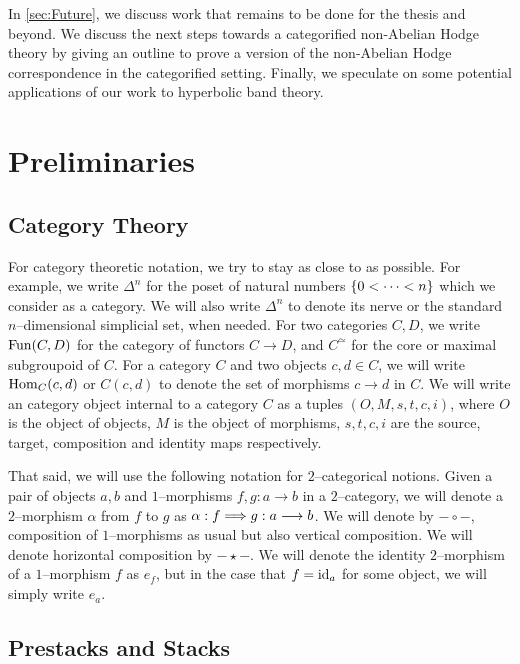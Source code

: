 \documentclass[11pt]{amsart}
\begin{document}
In \cref{sec:Future}, we discuss work that remains to be done for the thesis
and beyond. We discuss the next steps towards a categorified
non-Abelian Hodge theory by giving an outline to prove a version
of the non-Abelian Hodge correspondence in the categorified setting.
Finally, we speculate on some potential applications of our
work to hyperbolic band theory.


\section{Preliminaries}\label{sec:Prelim}

\subsection{Category Theory}

For category theoretic notation, we try to stay as close to \cite{HTT} as
possible. For example, we write $\Delta^n$ for the poset of natural numbers
$\set{0 < \dots < n}$ which we consider as a category. We will also write
$\Delta^n$ to denote its nerve or the standard $n$--dimensional
simplicial set, when needed.
For two categories $C, D$, we write $\mathrm{Fun}(C, D)$ for the
category of functors $C \to D$, and $C^\simeq$ for the core or maximal
subgroupoid of $C$. For a category $C$ and two objects
$c, d \in C$, we will write $\mathrm{Hom}_C(c, d)$ or $C(c, d)$ to denote
the set of morphisms $c \to d$ in $C$.
We will write an category object internal to a category $C$
as a tuples $(O, M, s, t, c, i)$, where $O$ is the object of objects,
$M$ is the object of morphisms, $s, t, c, i$ are the source, target,
composition and identity maps respectively.

That said, we will use the following notation for $2$--categorical notions.
Given a pair of objects $a, b$ and $1$--morphisms $f, g : a \to b$ in a
$2$--category, we will denote a $2$--morphism $\alpha$ from $f$ to $g$ as
$\alpha : f \To g : a \to b$. We will denote by $- \circ -$, composition of
$1$--morphisms as usual but also vertical composition. We will denote
horizontal composition by $- \star -$. We will denote the identity $2$--morphism
of a $1$--morphism $f$ as $e_f$, but in the case that $f = \mathrm{id}_a$ for some
object, we will simply write $e_a$.

\subsection{Prestacks and Stacks}
\end{document}
